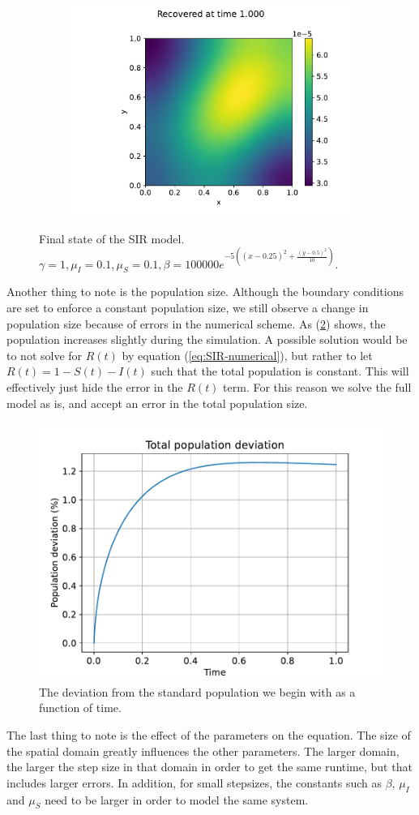 \begin{figure}
\begin{subfigure}[b]{0.49\linewidth}
        \includegraphics[width=\textwidth]{report/Images/plots/plot-i_t=10000-2.pdf}
    \end{subfigure}
    \caption{Final state of the SIR model. $\gamma = 1,\mu_I = 0.1,\mu_S = 0.1, \beta = 100 000 e^{-5((x-0.25)^2 + \frac{(y-0.5)^2}{10})}$.}
    \label{fig:state_10000}
\end{figure}

Another thing to note is the population size. Although the boundary conditions are set to enforce a constant population size, we still observe a change in population size because of errors in the numerical scheme.
As (\ref{fig:non-constant-population-size}) shows, the population increases slightly during the simulation. 
A possible solution would be to not 
solve for $R(t)$ by equation (\ref{eq:SIR-numerical}), but rather to let $R(t) = 1- S(t)-I(t)$ such that the total population is constant. This will effectively just 
hide the error in the $R(t)$ term. For this reason we solve the full model as is, and accept an error in the total population size.
\begin{figure}[H]
    \centering
    \includegraphics[width=0.5\linewidth]{report/Images/plots/pop_deviation.pdf}
    \caption{The deviation from the standard population we begin with as a function of time.}
    \label{fig:non-constant-population-size}
\end{figure}

The last thing to note is the effect of the parameters on the equation. The size of the spatial domain greatly influences the other 
parameters. The larger domain, the larger the step size in that domain in order to get the same runtime, but that includes larger errors.
In addition, for small stepsizes, the constants such as $\beta$, $\mu_I$ and $\mu_S$ need to be larger in order to model the same system.